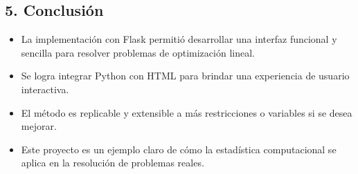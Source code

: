 \documentclass[a4paper,10pt]{article}
\begin{document}
\subsection*{5. Conclusi\'on}
\begin{itemize}
  \item La implementaci\'on con Flask permiti\'o desarrollar una interfaz funcional y sencilla para resolver problemas de optimizaci\'on lineal.
  \item Se logra integrar Python con HTML para brindar una experiencia de usuario interactiva.
  \item El m\'etodo es replicable y extensible a m\'as restricciones o variables si se desea mejorar.
  \item Este proyecto es un ejemplo claro de c\'omo la estad\'istica computacional se aplica en la resoluci\'on de problemas reales.
\end{itemize}
\end{document}
